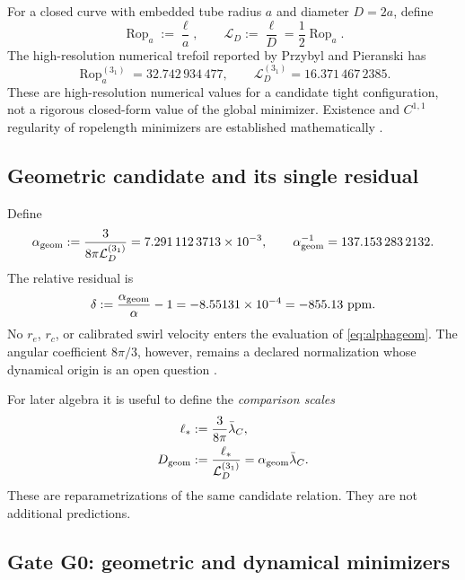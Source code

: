 \documentclass[aps,pre,preprint,notitlepage,nofootinbib,superscriptaddress]{revtex4-2}
\newcommand{\lC}{\bar\lambda_C}
\newcommand{\Rop}{\operatorname{Rop}}
\newcommand{\calL}{\mathcal L}
\begin{document}
For a closed curve with embedded tube radius \(a\) and diameter \(D=2a\), define
\begin{equation}
  \Rop_a:=\frac{\ell}{a},
  \qquad
  \calL_D:=\frac{\ell}{D}
  =\frac12\Rop_a.
  \label{eq:rope-conventions}
\end{equation}
The high-resolution numerical trefoil reported by Przybyl and Pieranski
\cite{PrzybylPieranski2014} has
\begin{equation}
  \Rop_a^{(3_1)}=32.742\,934\,477,
  \qquad
  \calL_D^{(3_1)}=16.371\,467\,2385.
  \label{eq:ropelength}
\end{equation}
These are high-resolution numerical values for a candidate tight configuration, not a rigorous closed-form value of the global minimizer.  Existence and \(C^{1,1}\) regularity of ropelength minimizers are established mathematically \cite{CantarellaKusnerSullivan2002}.

\subsection{Geometric candidate and its single residual}

Define
\begin{equation}
  \alpha_{\rm geom}
  :=\frac{3}{8\pi\calL_D^{(3_1)}}
  =7.291\,112\,3713\times10^{-3},
  \qquad
  \alpha_{\rm geom}^{-1}
  =137.153\,283\,2132.
  \label{eq:alphageom}
\end{equation}
The relative residual is
\begin{equation}
  \delta
  :=\frac{\alpha_{\rm geom}}{\alpha}-1
  =-8.55131\times10^{-4}
  =-855.13\ \mathrm{ppm}.
  \label{eq:residual}
\end{equation}
No \(r_e\), \(r_c\), or calibrated swirl velocity enters the evaluation of
\cref{eq:alphageom}.  The angular coefficient \(8\pi/3\), however, remains a declared normalization whose dynamical origin is an open question \cite{Iskandarani2026}.

For later algebra it is useful to define the \emph{comparison scales}
\begin{align}
  \ell_* &:=\frac{3}{8\pi}\lC,
  \label{eq:ellstar}\\
  D_{\rm geom}
  &:=\frac{\ell_*}{\calL_D^{(3_1)}}
  =\alpha_{\rm geom}\lC.
  \label{eq:Dgeom}
\end{align}
These are reparametrizations of the same candidate relation.  They are not additional predictions.

\subsection{Gate G0: geometric and dynamical minimizers}
\label{subsec:G0}
\end{document}
